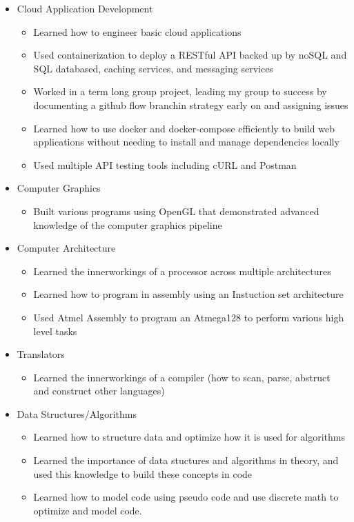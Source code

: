 \documentclass[12pt,letterpaper]{article}
\begin{document}
\begin{itemize}
		\item Cloud Application Development
		\begin{itemize}
			\item Learned how to engineer basic cloud applications
			\item Used containerization to deploy a RESTful API backed up by noSQL and SQL databased, caching services, and messaging services
			\item Worked in a term long group project, leading my group to success by documenting a github flow branchin strategy early on and assigning issues
			\item Learned how to use docker and docker-compose efficiently to build web applications without needing to install and manage dependencies locally
			\item Used multiple API testing tools including cURL and Postman
		\end{itemize}

		\item Computer Graphics
		\begin{itemize}
			\item Built various programs using OpenGL that demonstrated advanced knowledge of the computer graphics pipeline
		\end{itemize}

		\item Computer Architecture
		\begin{itemize}
			\item Learned the innerworkings of a processor across multiple architectures
			\item Learned how to program in assembly using an Instuction set architecture
			\item Used Atmel Assembly to program an Atmega128 to perform various high level tasks
		\end{itemize}

		\item Translators
		\begin{itemize}
			\item Learned the innerworkings of a compiler (how to scan, parse, abstruct and construct other languages)
		\end{itemize}

		\item Data Structures/Algorithms
		\begin{itemize}
			\item Learned how to structure data and optimize how it is used for algorithms
			\item Learned the importance of data stuctures and algorithms in theory, and used this knowledge to build these concepts in code
			\item Learned how to model code using pseudo code and use discrete math to optimize and model code. 
		\end{itemize}


\end{itemize}
\end{document}
